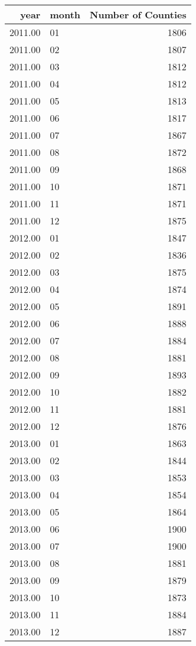 \begin{tabular}{rlr}
  \hline
year & month & Number of Counties \\ 
  \hline
2011.00 & 01 & 1806 \\ 
  2011.00 & 02 & 1807 \\ 
  2011.00 & 03 & 1812 \\ 
  2011.00 & 04 & 1812 \\ 
  2011.00 & 05 & 1813 \\ 
  2011.00 & 06 & 1817 \\ 
  2011.00 & 07 & 1867 \\ 
  2011.00 & 08 & 1872 \\ 
  2011.00 & 09 & 1868 \\ 
  2011.00 & 10 & 1871 \\ 
  2011.00 & 11 & 1871 \\ 
  2011.00 & 12 & 1875 \\ 
  2012.00 & 01 & 1847 \\ 
  2012.00 & 02 & 1836 \\ 
  2012.00 & 03 & 1875 \\ 
  2012.00 & 04 & 1874 \\ 
  2012.00 & 05 & 1891 \\ 
  2012.00 & 06 & 1888 \\ 
  2012.00 & 07 & 1884 \\ 
  2012.00 & 08 & 1881 \\ 
  2012.00 & 09 & 1893 \\ 
  2012.00 & 10 & 1882 \\ 
  2012.00 & 11 & 1881 \\ 
  2012.00 & 12 & 1876 \\ 
  2013.00 & 01 & 1863 \\ 
  2013.00 & 02 & 1844 \\ 
  2013.00 & 03 & 1853 \\ 
  2013.00 & 04 & 1854 \\ 
  2013.00 & 05 & 1864 \\ 
  2013.00 & 06 & 1900 \\ 
  2013.00 & 07 & 1900 \\ 
  2013.00 & 08 & 1881 \\ 
  2013.00 & 09 & 1879 \\ 
  2013.00 & 10 & 1873 \\ 
  2013.00 & 11 & 1884 \\ 
  2013.00 & 12 & 1887 \\ 

\end{tabular}
